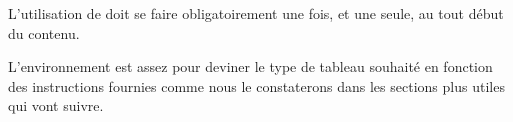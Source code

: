 \documentclass[10pt, a4paper]{article}
\begin{document}
\begin{tdocexa}
    \leavevmode

\end{tdocexa}




\begin{tdocwarn}
	L'utilisation de  doit se faire obligatoirement une fois, et une seule, au tout début du contenu.
\end{tdocwarn}




\begin{tdocnote}
	L'environnement  est assez  pour deviner le type de tableau souhaité en fonction des instructions fournies comme nous le constaterons dans les sections plus utiles qui vont suivre.
\end{tdocnote}
\end{document}
